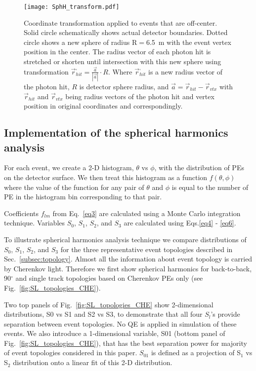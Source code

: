 \begin{figure*}[h]
  \centering
  \texttt{[image: SphH\_transform.pdf]}
  \caption{Coordinate transformation applied to events that are
    off-center. Solid circle schematically shows actual detector
    boundaries. Dotted circle shows a new sphere of radius R$=$6.5~m
    with the event vertex position in the center. The radius vector of
    each photon hit is stretched or shorten until intersection with
    this new sphere using transformation $\vec{r}^{,}_{hit} =
    \frac{\vec{a}}{|\vec{a}|} \cdot R$. Where $\vec{r}^{,}_{hit}$ is a
    new radius vector of the photon hit, $R$ is detector sphere radius,
    and $\vec{a}=\vec{r}_{hit} - \vec{r}_{vtx}$ with $\vec{r}_{hit}$
    and $\vec{r}_{vtx}$ being radius vectors of the photon hit and
    vertex position in original coordinates and correspondingly.}
  \label{fig:SphH_transform}
\end{figure*}


\subsection{Implementation of the spherical harmonics analysis}

For each event, we create a 2-D histogram, $\theta$ vs $\phi$, with the distribution of PEs on the detector surface. We then treat this histogram as a function $f(\theta,\phi)$ where the value of the function for any pair of $\theta$ and $\phi$ is equal to the number of PE in the histogram bin corresponding to that pair.

Coefficients $f_{lm}$ from Eq.~\ref{eq3} are calculated using a Monte Carlo integration technique. Variables $S_0$, $S_1$, $S_2$, and $S_3$ are calculated using Eqs.\ref{eq4} - \ref{eq6}.

To illustrate spherical harmonics analysis technique we compare distributions of $S_0$, $S_1$, $S_2$, and $S_3$ for the three representative event topologies described in Sec.~\ref{subsec:topology}. Almost all the information about event topology is carried by Cherenkov light. Therefore we first show spherical harmonics for back-to-back,  90$^{\circ}$ and single track topologies based on Cherenkov PEs only (see Fig.~\ref{fig:SL_topologies_CHE}).

Two top panels of Fig.~\ref{fig:SL_topologies_CHE} show 2-dimensional distributions, S0 vs S1 and S2 vs S3, to demonstrate that all four $S_l$'s provide separation between event topologies. No QE is applied in simulation of these events. We also introduce a 1-dimensional variable, S01 (bottom panel of Fig.~\ref{fig:SL_topologies_CHE}), that has the best separation power for majority of event topologies considered in this paper. $S_{01}$ is defined as a projection of S$_1$ vs S$_2$ distribution onto a linear fit of this 2-D distribution.

